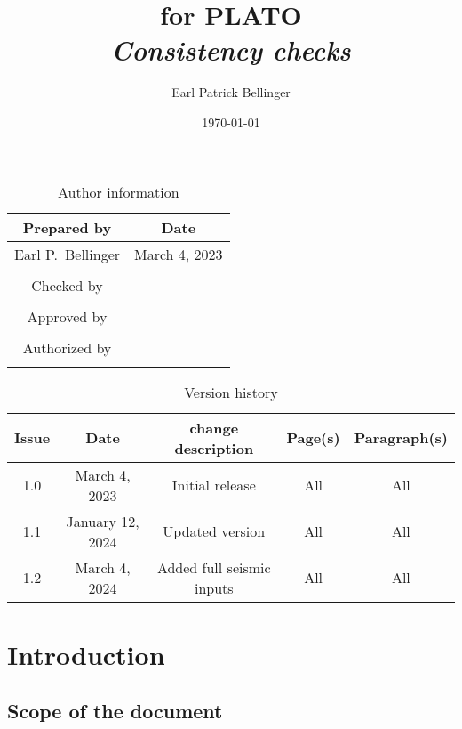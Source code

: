 \documentclass[a4paper, oneside, 11pt, article, english]{memoir}
\author{Earl Patrick Bellinger}
\title{\shorttitle{} for PLATO \\ \Large\textit{Consistency checks}}
\date{\today}
\begin{document}
\maketitle

\begin{table}[htbp]
  \centering
  \caption{Author information}
  \label{tab:author}
  \begin{tabular}{cc}
    \toprule
    Prepared by & Date\\
    \midrule
    Earl P.\ Bellinger & March 4, 2023 \\
    \\
    Checked by \\
    \midrule
    \\
    Approved by \\
    \midrule
    \\
    Authorized by \\
    \midrule
    \\
    \bottomrule
  \end{tabular}
\end{table}

\begin{table}[htbp]
  \centering
  \caption{Version history}
  \label{tab:version}
  \begin{tabular}{ccccc}
    \toprule
    Issue & Date & \textnumero{} change description & Page(s) & Paragraph(s) \\
    \midrule
    1.0 & March 4, 2023 & Initial release & All & All \\
    1.1 & January 12, 2024 & Updated version & All & All \\
    1.2 & March 4, 2024 & Added full seismic inputs & All & All \\
    \bottomrule
  \end{tabular}
\end{table}


\clearpage
\tableofcontents*
\clearpage


\chapter{Introduction}
\label{chap:intro}

\section{Scope of the document}
\label{sec:scope}
\end{document}
